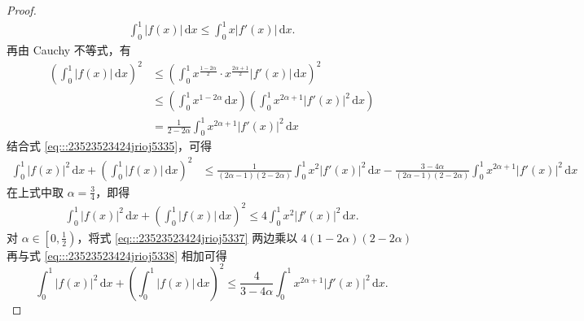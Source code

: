 \documentclass[../../main.tex]{subfiles}%
\begin{document}
\begin{proof}
\begin{align}
\int_{0}^{1} |f(x)| \, \mathrm{d}x \leqslant \int_{0}^{1} x |f'(x)| \, \mathrm{d}x. \label{eq:::23523523424jrioj5336}
\end{align}
再由 Cauchy 不等式，有
\begin{align*}
\left( \int_{0}^{1} |f(x)| \, \mathrm{d}x \right)^2 &\leqslant \left( \int_{0}^{1} x^{\frac{1 - 2\alpha}{2}} \cdot x^{\frac{2\alpha + 1}{2}} |f'(x)| \, \mathrm{d}x \right)^2 \\
&\leqslant \left( \int_{0}^{1} x^{1 - 2\alpha} \, \mathrm{d}x \right) \left( \int_{0}^{1} x^{2\alpha + 1} |f'(x)|^2 \, \mathrm{d}x \right)
\\
&= \frac{1}{2 - 2\alpha} \int_{0}^{1} x^{2\alpha + 1} |f'(x)|^2 \, \mathrm{d}x
\end{align*}
结合式 \eqref{eq:::23523523424jrioj5335}，可得
\begin{align}
\int_{0}^{1} |f(x)|^2 \, \mathrm{d}x + \left( \int_{0}^{1} |f(x)| \, \mathrm{d}x \right)^2 &\leqslant \frac{1}{(2\alpha - 1)(2 - 2\alpha)} \int_{0}^{1} x^2 |f'(x)|^2 \, \mathrm{d}x - \frac{3 - 4\alpha}{(2\alpha - 1)(2 - 2\alpha)} \int_{0}^{1} x^{2\alpha + 1} |f'(x)|^2 \, \mathrm{d}x \label{eq:::23523523424jrioj5337}
\end{align}
在上式中取 \( \alpha = \frac{3}{4} \)，即得
\begin{align}
\int_{0}^{1} |f(x)|^2 \, \mathrm{d}x + \left( \int_{0}^{1} |f(x)| \, \mathrm{d}x \right)^2 \leqslant 4 \int_{0}^{1} x^2 |f'(x)|^2 \, \mathrm{d}x .\label{eq:::23523523424jrioj5338}
\end{align}
对 \( \alpha \in \left[0, \frac{1}{2}\right) \)，将式 \eqref{eq:::23523523424jrioj5337} 两边乘以 \( 4(1 - 2\alpha)(2 - 2\alpha) \) 再与式 \eqref{eq:::23523523424jrioj5338} 相加可得
\[
\int_{0}^{1} |f(x)|^2 \, \mathrm{d}x + \left( \int_{0}^{1} |f(x)| \, \mathrm{d}x \right)^2 \leqslant \frac{4}{3 - 4\alpha} \int_{0}^{1} x^{2\alpha + 1} |f'(x)|^2 \, \mathrm{d}x.
\]
\end{proof}
\end{document}
